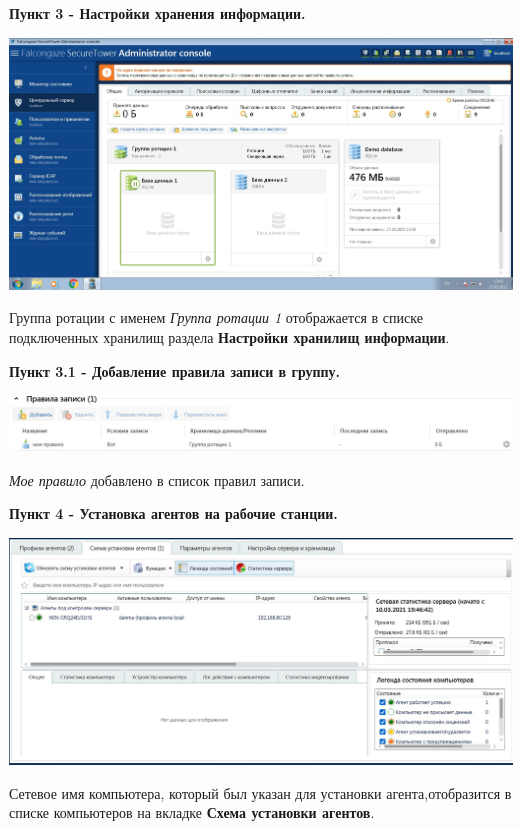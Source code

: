 \documentclass[a4paper,14pt]{extarticle}
\begin{document}
    \textbf{Пункт 3 - Настройки хранения информации.} 
    \begin{center}
        \includegraphics[scale=0.25]{pics/3.jpg}

        Группа ротации с именем \emph{Группа ротации 1} отображается в списке подключенных хранилищ раздела \textbf{Настройки хранилищ информации}.
    \end{center}

    \textbf{Пункт 3.1 - Добавление правила записи в группу.} 
    \begin{center}
        \includegraphics[scale=0.3]{pics/3_1.jpg}

        \emph{Мое правило} добавлено в список правил записи.
    \end{center}

    \textbf{Пункт 4 - Установка агентов на рабочие станции.} 
    \begin{center}
        \includegraphics[scale=0.3]{pics/4.jpg}

        Сетевое имя компьютера, который был указан для установки агента,отобразится в списке компьютеров на вкладке \textbf{Схема установки агентов}. 
    \end{center}
\end{document}

